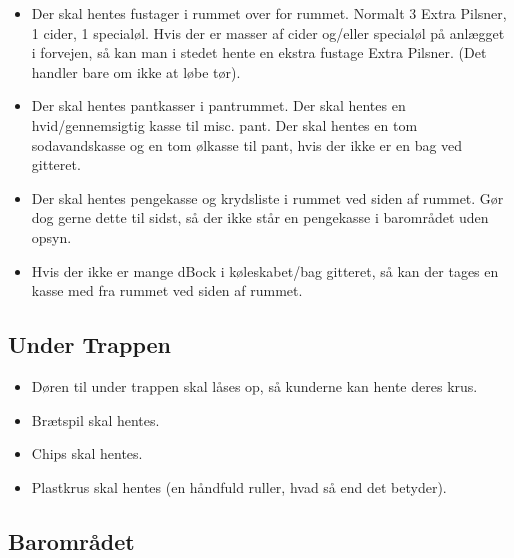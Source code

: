 \begin{itemize}
\item Der skal hentes fustager i rummet over for rummet. Normalt 3
  Extra Pilsner, 1 cider, 1 specialøl. Hvis der er masser af cider
  og/eller specialøl på anlægget i forvejen, så kan man i stedet hente
  en ekstra fustage Extra Pilsner. (Det handler bare om ikke at løbe
  tør).
\item Der skal hentes pantkasser i pantrummet. Der skal hentes en
  hvid/gennemsigtig kasse til misc. pant. Der skal hentes en tom
  sodavandskasse og en tom ølkasse til pant, hvis der ikke er en bag
  ved gitteret.
\item Der skal hentes pengekasse og krydsliste i rummet ved siden af
  rummet. Gør dog gerne dette til sidst, så der ikke står en
  pengekasse i barområdet uden opsyn.
\item Hvis der ikke er mange dBock\texttrademark{} i køleskabet/bag gitteret, så kan
  der tages en kasse med fra rummet ved siden af rummet.
\end{itemize}


\subsection{Under Trappen}
\label{sec:pre:under-trappen}

\begin{itemize}
\item Døren til under trappen skal låses op, så kunderne kan hente
  deres krus.
\item Brætspil skal hentes.
\item Chips skal hentes.
\item Plastkrus skal hentes (en håndfuld ruller, hvad så end det
  betyder).
\end{itemize}

\subsection{Barområdet}
\label{sec:pre:baromradet}

